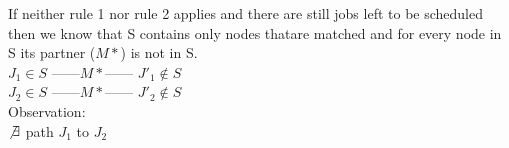 If neither rule 1 nor rule 2 applies and there are still jobs left to be scheduled then we know that S contains only nodes thatare matched
and for every node in S its partner ($M*$) is not in S.\\

$J{_1} \in S$ ------$M*$------
$J'{_1} \notin S$\\

$J{_2} \in S$ ------$M*$------
$J'{_2} \notin S$\\

Observation:\\
$\not\exists$ path $J_{1}$ to $J_{2}$ 




